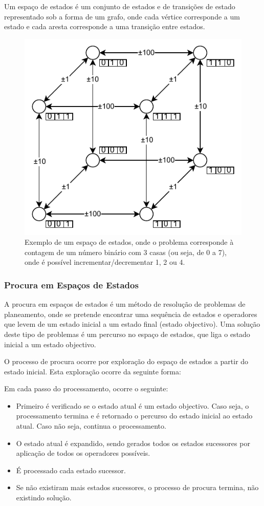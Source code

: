 \documentclass[a4paper,12pt]{article}
\begin{document}
Um espaço de estados é um conjunto de estados e de transições de estado representado sob a forma de um grafo, onde cada vértice corresponde a um estado e cada aresta corresponde a uma transição entre estados.
\begin{figure}[h]
\centering
\includegraphics{espaco_estados}
\caption{Exemplo de um espaço de estados, onde o problema corresponde à contagem de um número binário com 3 casas (ou seja, de 0 a 7), onde é possível incrementar/decrementar 1, 2 ou 4.}
\end{figure}

\subsubsection{Procura em Espaços de Estados}
A procura em espaços de estados é um método de resolução de problemas de planeamento, onde se pretende encontrar uma sequência de estados e operadores que levem de um estado inicial a um estado final (estado objectivo).
Uma solução deste tipo de problemas é um percurso no espaço de estados, que liga o estado inicial a um estado objectivo.

O processo de procura ocorre por exploração do espaço de estados a partir do estado inicial. Esta exploração ocorre da seguinte forma:

Em cada passo do processamento, ocorre o seguinte:
\begin{itemize}
	\item Primeiro é verificado se o estado atual é um estado objectivo. Caso seja, o processamento termina e é retornado o percurso do estado inicial ao estado atual. Caso não seja, continua o processamento.
	\item O estado atual é expandido, sendo gerados todos os estados sucessores por aplicação de todos os operadores possíveis.
	\item É processado cada estado sucessor.
	\item Se não existiram mais estados sucessores, o processo de procura termina, não existindo solução.
\end{itemize}
\end{document}
